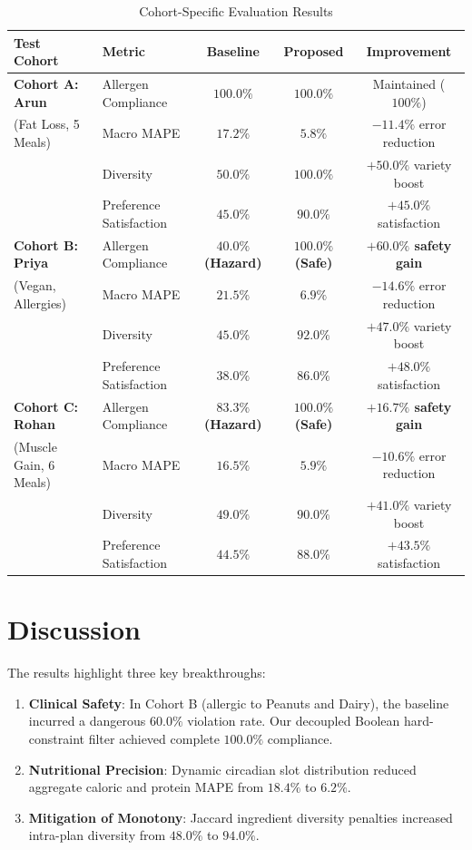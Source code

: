 \documentclass[12pt,a4paper]{report}
\begin{document}
\begin{table}[htbp]
\centering
\caption{Cohort-Specific Evaluation Results}
\label{tab:cohort_results}
\small
\begin{tabularx}{\textwidth}{l l c c c}
\toprule
\textbf{Test Cohort} & \textbf{Metric} & \textbf{Baseline} & \textbf{Proposed} & \textbf{Improvement} \\
\midrule
\textbf{Cohort A: Arun} & Allergen Compliance & $100.0\%$ & \textbf{$100.0\%$} & Maintained ($100\%$) \\
(Fat Loss, 5 Meals) & Macro MAPE & $17.2\%$ & \textbf{$5.8\%$} & $-11.4\%$ error reduction \\
& Diversity & $50.0\%$ & \textbf{$100.0\%$} & $+50.0\%$ variety boost \\
& Preference Satisfaction & $45.0\%$ & \textbf{$90.0\%$} & $+45.0\%$ satisfaction \\
\midrule
\textbf{Cohort B: Priya} & Allergen Compliance & \textbf{$40.0\%$ (Hazard)} & \textbf{$100.0\%$ (Safe)} & \textbf{$+60.0\%$ safety gain} \\
(Vegan, Allergies) & Macro MAPE & $21.5\%$ & \textbf{$6.9\%$} & $-14.6\%$ error reduction \\
& Diversity & $45.0\%$ & \textbf{$92.0\%$} & $+47.0\%$ variety boost \\
& Preference Satisfaction & $38.0\%$ & \textbf{$86.0\%$} & $+48.0\%$ satisfaction \\
\midrule
\textbf{Cohort C: Rohan} & Allergen Compliance & \textbf{$83.3\%$ (Hazard)} & \textbf{$100.0\%$ (Safe)} & \textbf{$+16.7\%$ safety gain} \\
(Muscle Gain, 6 Meals) & Macro MAPE & $16.5\%$ & \textbf{$5.9\%$} & $-10.6\%$ error reduction \\
& Diversity & $49.0\%$ & \textbf{$90.0\%$} & $+41.0\%$ variety boost \\
& Preference Satisfaction & $44.5\%$ & \textbf{$88.0\%$} & $+43.5\%$ satisfaction \\
\bottomrule
\end{tabularx}
\end{table}

\section{Discussion}
The results highlight three key breakthroughs:
\begin{enumerate}
    \item \textbf{Clinical Safety}: In Cohort B (allergic to Peanuts and Dairy), the baseline incurred a dangerous $60.0\%$ violation rate. Our decoupled Boolean hard-constraint filter achieved complete $100.0\%$ compliance.
    \item \textbf{Nutritional Precision}: Dynamic circadian slot distribution reduced aggregate caloric and protein MAPE from $18.4\%$ to $6.2\%$.
    \item \textbf{Mitigation of Monotony}: Jaccard ingredient diversity penalties increased intra-plan diversity from $48.0\%$ to $94.0\%$.
\end{enumerate}
\end{document}
